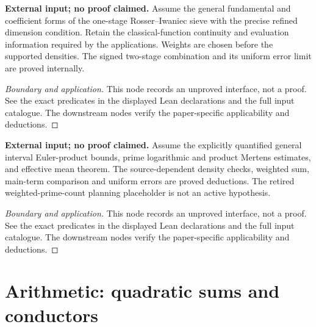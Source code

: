 \begin{lemma}
\label{input_sieve}
\textbf{External input; no proof claimed.} Assume the general fundamental and coefficient forms of the one-stage Rosser--Iwaniec sieve with the precise refined dimension condition. Retain the classical-function continuity and evaluation information required by the applications. Weights are chosen before the supported densities. The signed two-stage combination and its uniform error limit are proved internally.
\end{lemma}
\begin{proof}[Boundary and application]
This node records an unproved interface, not a proof. See the exact predicates in the displayed Lean declarations and the full input catalogue. The downstream nodes verify the paper-specific applicability and deductions.
\end{proof}

\begin{lemma}
\label{input_mertens_mean}
\textbf{External input; no proof claimed.} Assume the explicitly quantified general interval Euler-product bounds, prime logarithmic and product Mertens estimates, and effective mean theorem. The source-dependent density checks, weighted sum, main-term comparison and uniform errors are proved deductions. The retired weighted-prime-count planning placeholder is not an active hypothesis.
\end{lemma}
\begin{proof}[Boundary and application]
This node records an unproved interface, not a proof. See the exact predicates in the displayed Lean declarations and the full input catalogue. The downstream nodes verify the paper-specific applicability and deductions.
\end{proof}

\section{Arithmetic: quadratic sums and conductors}


